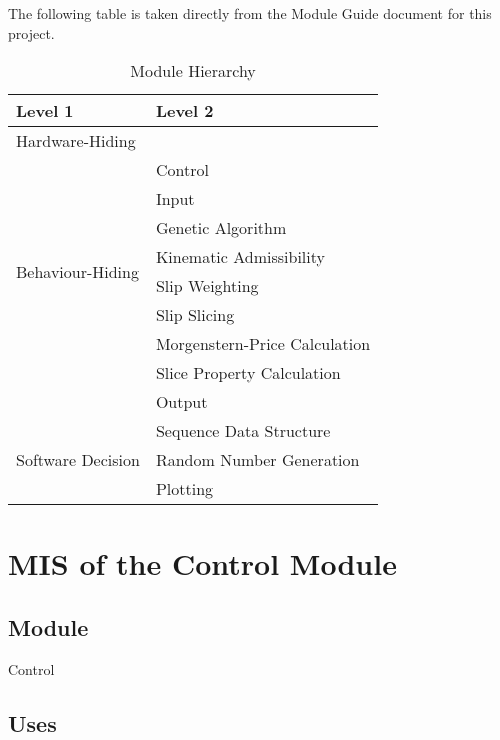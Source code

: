 \documentclass[12pt, titlepage]{article}
\begin{document}
The following table is taken directly from the Module Guide document for this 
project.

\begin{table}[h!]
	\centering
	\begin{tabular}{p{} p{} }
		\toprule
		\textbf{Level 1} & \textbf{Level 2} \\
		\midrule
		
		{Hardware-Hiding} & ~ \\
		\midrule
		
		\multirow{8}{0.3\textwidth}{Behaviour-Hiding} &
		Control \\
		& Input \\
		& Genetic Algorithm \\
		& Kinematic Admissibility \\
		& Slip Weighting \\
		& Slip Slicing \\
		& Morgenstern-Price Calculation \\
		& Slice Property Calculation \\
		& Output \\
		\midrule
		
		\multirow{3}{0.3\textwidth}{Software Decision} &
		Sequence Data Structure \\
		& Random Number Generation \\
		& Plotting \\
		\bottomrule
		
	\end{tabular}
	\caption{Module Hierarchy}
	\label{Table:Decomp}
\end{table}


\section{MIS of the Control Module}

\subsection{Module}
Control

\subsection{Uses}
\end{document}
